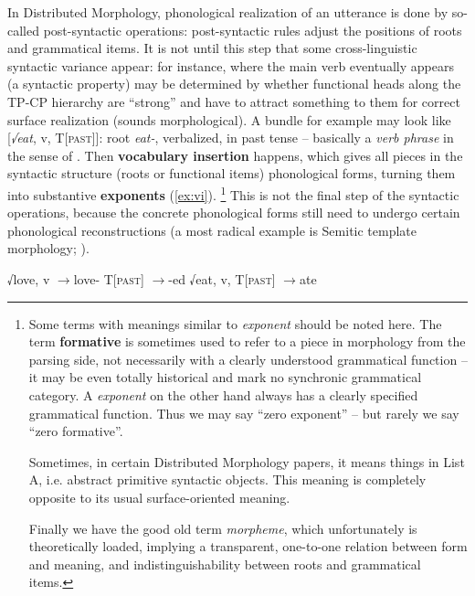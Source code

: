 \documentclass[a4paper, oneside, scheme=plain, 12pt]{article}
\newcommand*{\textto}{$\to$}
\newcommand*{\concept}[1]{\textbf{#1}}
\newcommand*{\term}[1]{\emph{#1}}
\newcommand{\form}[1]{\emph{#1}}
\newcommand*{\category}[1]{\textsc{#1}}
\begin{document}
In Distributed Morphology, phonological realization of an utterance
is done by so-called post-syntactic operations:
post-syntactic rules adjust the positions of roots and grammatical items.
It is not until this step that some cross-linguistic syntactic variance appear:
for instance, where the main verb eventually appears (a syntactic property) may be determined by
whether functional heads along the TP-CP hierarchy are ``strong''
and have to attract something to them for correct surface realization
(sounds morphological).
A bundle for example may look like [\form{√eat}, v, T[\category{past}]]:
root \form{eat-}, verbalized, in past tense -- basically a \term{verb phrase}
in the sense of .
Then \concept{vocabulary insertion} happens,
which gives all pieces in the syntactic structure (roots or functional items) phonological forms,
turning them into substantive \concept{exponents} (\ref{ex:vi}).%
\footnote{
    Some terms with meanings similar to \term{exponent} should be noted here.
    The term \concept{formative} is sometimes used to refer to a piece in morphology from the parsing side, not necessarily with a clearly understood grammatical function --
    it may be even totally historical and mark no synchronic grammatical category.
    A \term{exponent} on the other hand always has a clearly specified grammatical function.
    Thus we may say ``zero exponent'' -- but rarely we say ``zero formative''.

    Sometimes, in certain Distributed Morphology papers, it means things in List A,
    i.e. abstract primitive syntactic objects. 
    This meaning is completely opposite to its usual surface-oriented meaning.

    Finally we have the good old term \term{morpheme},
    which unfortunately is theoretically loaded, implying a transparent,
    one-to-one relation between form and meaning,
    and indistinguishability between roots and grammatical items.
}
This is not the final step of the syntactic operations,
because the concrete phonological forms still need to undergo certain phonological reconstructions
(a most radical example is Semitic template morphology; \citealt{tucker2011morphosyntax}).

\begin{exe}
    \ex\label{ex:vi} \begin{xlist}
        \ex √love, v \textto love-
        \ex T[\category{past}] \textto -ed
        \ex √eat, v, T[\category{past}] \textto ate
    \end{xlist}
\end{exe}
\end{document}
